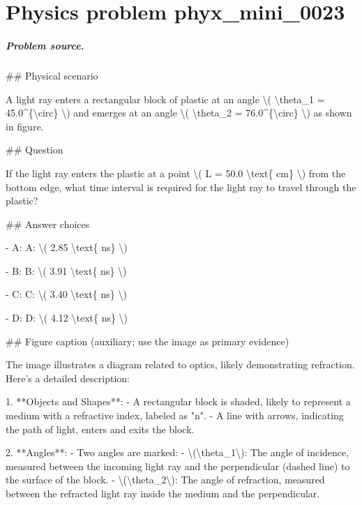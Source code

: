 
\chapter{Physics problem phyx\_mini\_0023}
\label{ch:PhyXMiniProblems_problem_phyx_mini_0023}

\paragraph{Problem source.}
\#\# Physical scenario

A light ray enters a rectangular block of plastic at an angle \textbackslash{}( \textbackslash{}theta\_1 = 45.0\textasciicircum{}\{\textbackslash{}circ\} \textbackslash{}) and emerges at an angle \textbackslash{}( \textbackslash{}theta\_2 = 76.0\textasciicircum{}\{\textbackslash{}circ\} \textbackslash{}) as shown in figure.

\#\# Question

If the light ray enters the plastic at a point \textbackslash{}( L = 50.0 \textbackslash{}text\{ cm\} \textbackslash{}) from the bottom edge, what time interval is required for the light ray to travel through the plastic?

\#\# Answer choices

- A: A: \textbackslash{}( 2.85 \textbackslash{}text\{ ns\} \textbackslash{})

- B: B: \textbackslash{}( 3.91 \textbackslash{}text\{ ns\} \textbackslash{})

- C: C: \textbackslash{}( 3.40 \textbackslash{}text\{ ns\} \textbackslash{})

- D: D: \textbackslash{}( 4.12 \textbackslash{}text\{ ns\} \textbackslash{})

\#\# Figure caption (auxiliary; use the image as primary evidence)

The image illustrates a diagram related to optics, likely demonstrating refraction. Here’s a detailed description:

1. **Objects and Shapes**:
   - A rectangular block is shaded, likely to represent a medium with a refractive index, labeled as "n".
   - A line with arrows, indicating the path of light, enters and exits the block.

2. **Angles**:
   - Two angles are marked:
     - \textbackslash{}(\textbackslash{}theta\_1\textbackslash{}): The angle of incidence, measured between the incoming light ray and the perpendicular (dashed line) to the surface of the block.
     - \textbackslash{}(\textbackslash{}theta\_2\textbackslash{}): The angle of refraction, measured between the refracted light ray inside the medium and the perpendicular.

